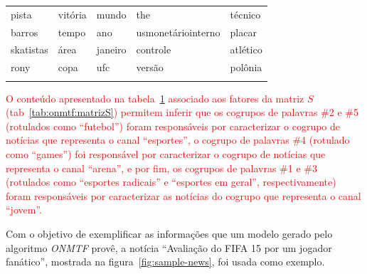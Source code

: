 \documentclass[
    12pt,                %
    oneside,            %
    a4paper,            %
    english,            %
    brazil                %
    ]{abntex2ppgsi}
\begin{document}
\begin{table}[H]
{\begin{tabular}{lllll}
            pista      & vitória    & mundo      & the                & técnico \\
            barros     & tempo      & ano        & usmonetáriointerno & placar \\
            skatistas  & área       & janeiro    & controle           & atlético \\
            rony       & copa       & ufc        & versão             & polônia \\
            \hline \\
        \end{tabular}
    }
    \label{tab:experiments-quali-words:onmtf}
\end{table}

\textcolor{red}{O conteúdo apresentado na tabela~\ref{tab:experiments-quali-words:onmtf} associado aos fatores da matriz $S$ (tab~\ref{tab:onmtf:matrizS}) permitem inferir que os cogrupos de palavras \#2 e \#5 (rotulados como ``futebol'') foram responsáveis por caracterizar o cogrupo de notícias que representa o canal ``esportes'', o cogrupo de palavras \#4 (rotulado como ``games'') foi responsável por caracterizar o cogrupo de notícias que representa o canal ``arena'', e por fim, os cogrupos de palavras \#1 e \#3 (rotulados como ``esportes radicais'' e ``esportes em geral'', respectivamente) foram responsáveis por caracterizar as notícias do cogrupo que representa o canal ``jovem''.}


Com o objetivo de exemplificar as informações que um modelo gerado pelo algoritmo \textit{ONMTF} provê, a notícia ``Avaliação do FIFA 15 por um jogador fanático'', mostrada na figura~\ref{fig:sample-news}, foi usada como exemplo.
\end{document}
